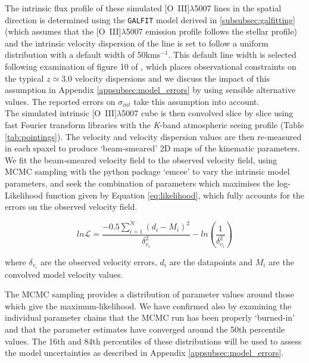 \documentclass[fleqn,usenatbib]{mn2e}
\newcommand{\Lagr}{\mathcal{L}}
\begin{document}
The intrinsic flux profile of these simulated [O~{\sc III}]$\lambda$5007 lines in the spatial direction is determined using the {\tt GALFIT} model derived in \cref{subsubsec:galfitting} (which assumes that the [O~{\sc III}]$\lambda$5007 emission profile follows the stellar profile) and the intrinsic velocity dispersion of the line is set to follow a uniform distribution with a default width of 50kms$^{-1}$.
This default line width is selected following examination of figure 10 of \cite{Wisnioski2015}, which places observational constraints on the typical $z\simeq3.0$ velocity dispersions and we discuss the impact of this assumption in Appendix \ref{appsubsec:model_errors} by using sensible alternative values.
The reported errors on $\sigma_{int}$ take this assumption into account. \\

The simulated intrinsic [O~{\sc III}]$\lambda$5007 cube is then convolved slice by slice using fast Fourier transform libraries with the {\it K}-band atmospheric seeing profile (Table \ref{tab:pointings}).
The velocity and velocity dispersion values are then re-measured in each spaxel to produce `beam-smeared' 2D maps of the kinematic parameters.
We fit the beam-smeared velocity field to the observed velocity field, using MCMC sampling with the python package `emcee' \citep{Foreman-Mackey2013} to vary the intrinsic model parameters, and seek the combination of parameters which maximises the log-Likelihood function given by Equation \ref{eq:likelihood}, which fully accounts for the errors on the observed velocity field.

\begin{equation}\label{eq:likelihood}
   ln\Lagr = \frac{-0.5\sum_{i=1}^{N}(d_{i} - M_{i})^{2}}{\delta_{v_{i}}^{2}} - ln\left(\frac{1}{\delta_{v_{i}}^{2}}\right)
\end{equation}

\noindent
where $\delta_{v_{i}}$ are the observed velocity errors, $d_{i}$ are the datapoints and $M_{i}$ are the convolved model velocity values.

The MCMC sampling provides a distribution of parameter values around those which give the maximum-likelihood.
We have confirmed also by examining the individual parameter chains that the MCMC run has been properly `burned-in' and that the parameter estimates have converged around the 50th percentile values.
The 16th and 84th percentiles of these distributions will be used to assess the model uncertainties as described in Appendix \ref{appsubsec:model_errors}.
\end{document}
